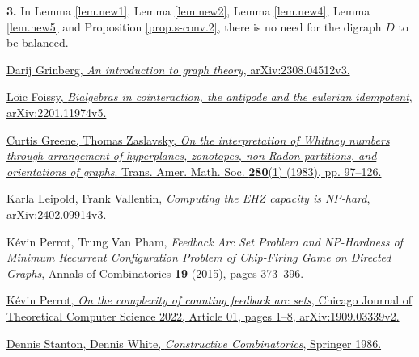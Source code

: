 \documentclass[numbers=enddot,12pt,final,onecolumn,notitlepage]{scrartcl}%
\theoremstyle{definition}
\theoremstyle{plainsl}
\begin{document}
\bigskip

\textbf{3.} In Lemma \ref{lem.new1}, Lemma \ref{lem.new2}, Lemma
\ref{lem.new4}, Lemma \ref{lem.new5} and Proposition \ref{prop.s-conv.2},
there is no need for the digraph $D$ to be balanced.

\begin{thebibliography}{99999999}                                                                                         %


\href{https://arxiv.org/abs/2308.04512v3}{Darij Grinberg,
\textit{An introduction to graph theory}, arXiv:2308.04512v3.}

%
\href{https://arxiv.org/abs/2201.11974v5}{Lo\"{\i}c Foissy, \textit{Bialgebras
in cointeraction, the antipode and the eulerian idempotent},
arXiv:2201.11974v5.}

%
\href{https://doi.org/10.1090/S0002-9947-1983-0712251-1}{Curtis Greene, Thomas
Zaslavsky, \textit{On the interpretation of Whitney numbers through
arrangement of hyperplanes, zonotopes, non-Radon partitions, and orientations
of graphs}. Trans. Amer. Math. Soc. \textbf{280}(1) (1983), pp. 97--126.}

\href{https://arxiv.org/abs/2402.09914v3}{Karla
Leipold, Frank Vallentin, \textit{Computing the EHZ capacity is NP-hard},
arXiv:2402.09914v3.}

K\'{e}vin Perrot, Trung Van Pham, \textit{Feedback
Arc Set Problem and NP-Hardness of Minimum Recurrent Configuration Problem of
Chip-Firing Game on Directed Graphs}, Annals of Combinatorics \textbf{19}
(2015), pages 373--396.

%
\href{https://arxiv.org/abs/1909.03339v2}{K\'{e}vin Perrot, \textit{On the
complexity of counting feedback arc sets}, Chicago Journal of Theoretical
Computer Science 2022, Article 01, pages 1--8, arXiv:1909.03339v2.}

%
\href{https://doi.org/10.1007/978-1-4612-4968-9}{Dennis Stanton, Dennis White,
\textit{Constructive Combinatorics}, Springer 1986.}
\end{thebibliography}
\end{document}
